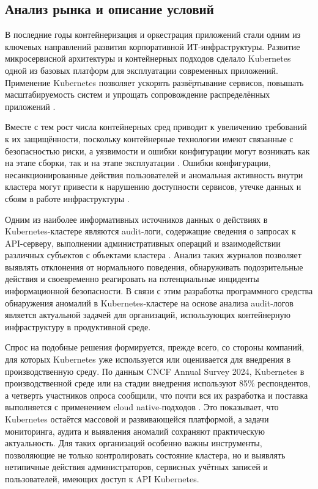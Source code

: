 \subsection{Анализ рынка и описание условий}

В последние годы контейнеризация и оркестрация приложений стали одним из ключевых направлений развития корпоративной ИТ-инфраструктуры. Развитие микросервисной архитектуры и контейнерных подходов сделало Kubernetes одной из базовых платформ для эксплуатации современных приложений. Применение Kubernetes позволяет ускорять развёртывание сервисов, повышать масштабируемость систем и упрощать сопровождение распределённых приложений \cite{Kubernetes}.

Вместе с тем рост числа контейнерных сред приводит к увеличению требований к их защищённости, поскольку контейнерные технологии имеют связанные с безопасностью риски, а уязвимости и ошибки конфигурации могут возникать как на этапе сборки, так и на этапе эксплуатации \cite{NISTSP800190,NISTSP800204C}. Ошибки конфигурации, несанкционированные действия пользователей и аномальная активность внутри кластера могут привести к нарушению доступности сервисов, утечке данных и сбоям в работе инфраструктуры \cite{NISTSP800190,NISTSP800204C}.

Одним из наиболее информативных источников данных о действиях в Kubernetes-кластере являются audit-логи, содержащие сведения о запросах к API-серверу, выполнении административных операций и взаимодействии различных субъектов с объектами кластера \cite{KubernetesAudit}. Анализ таких журналов позволяет выявлять отклонения от нормального поведения, обнаруживать подозрительные действия и своевременно реагировать на потенциальные инциденты информационной безопасности. В связи с этим разработка программного средства обнаружения аномалий в Kubernetes-кластере на основе анализа audit-логов является актуальной задачей для организаций, использующих контейнерную инфраструктуру в продуктивной среде.

Спрос на подобные решения формируется, прежде всего, со стороны компаний, для которых Kubernetes уже используется или оценивается для внедрения в производственную среду. По данным CNCF Annual Survey 2024, Kubernetes в производственной среде или на стадии внедрения используют 85\% респондентов, а четверть участников опроса сообщили, что почти вся их разработка и поставка выполняется с применением cloud native-подходов \cite{CNCFAnnualSurvey2024}. Это показывает, что Kubernetes остаётся массовой и развивающейся платформой, а задачи мониторинга, аудита и выявления аномалий сохраняют практическую актуальность. Для таких организаций особенно важны инструменты, позволяющие не только контролировать состояние кластера, но и выявлять нетипичные действия администраторов, сервисных учётных записей и пользователей, имеющих доступ к API Kubernetes.

